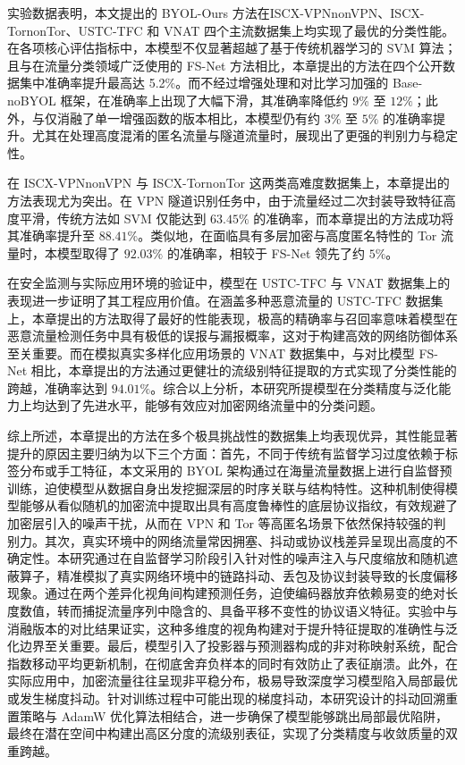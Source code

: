 实验数据表明，本文提出的 BYOL-Ours 方法在ISCX-VPNnonVPN、ISCX-TornonTor、USTC-TFC 和 VNAT 四个主流数据集上均实现了最优的分类性能。在各项核心评估指标中，本模型不仅显著超越了基于传统机器学习的 SVM 算法；且与在流量分类领域广泛使用的 FS-Net 方法相比，本章提出的方法在四个公开数据集中准确率提升最高达 5.2\%。而不经过增强处理和对比学习加强的 Base-noBYOL 框架，在准确率上出现了大幅下滑，其准确率降低约 $9\%$ 至 $12\%$；此外，与仅消融了单一增强函数的版本相比，本模型仍有约 $3\%$ 至 $5\%$ 的准确率提升。尤其在处理高度混淆的匿名流量与隧道流量时，展现出了更强的判别力与稳定性。

在 ISCX-VPNnonVPN 与 ISCX-TornonTor 这两类高难度数据集上，本章提出的方法表现尤为突出。在 VPN 隧道识别任务中，由于流量经过二次封装导致特征高度平滑，传统方法如 SVM 仅能达到 $63.45\%$ 的准确率，而本章提出的方法成功将其准确率提升至 $88.41\%$。类似地，在面临具有多层加密与高度匿名特性的 Tor 流量时，本模型取得了 $92.03\%$ 的准确率，相较于 FS-Net 领先了约 $5\%$。

在安全监测与实际应用环境的验证中，模型在 USTC-TFC 与 VNAT 数据集上的表现进一步证明了其工程应用价值。在涵盖多种恶意流量的 USTC-TFC 数据集上，本章提出的方法取得了最好的性能表现，极高的精确率与召回率意味着模型在恶意流量检测任务中具有极低的误报与漏报概率，这对于构建高效的网络防御体系至关重要。而在模拟真实多样化应用场景的 VNAT 数据集中，与对比模型 FS-Net 相比，本章提出的方法通过更健壮的流级别特征提取的方式实现了分类性能的跨越，准确率达到 $94.01\%$。综合以上分析，本研究所提模型在分类精度与泛化能力上均达到了先进水平，能够有效应对加密网络流量中的分类问题。

综上所述，本章提出的方法在多个极具挑战性的数据集上均表现优异，其性能显著提升的原因主要归纳为以下三个方面：首先，不同于传统有监督学习过度依赖于标签分布或手工特征，本文采用的 BYOL 架构通过在海量流量数据上进行自监督预训练，迫使模型从数据自身出发挖掘深层的时序关联与结构特性。这种机制使得模型能够从看似随机的加密流中提取出具有高度鲁棒性的底层协议指纹，有效规避了加密层引入的噪声干扰，从而在 VPN 和 Tor 等高匿名场景下依然保持较强的判别力。其次，真实环境中的网络流量常因拥塞、抖动或协议栈差异呈现出高度的不确定性。本研究通过在自监督学习阶段引入针对性的噪声注入与尺度缩放和随机遮蔽算子，精准模拟了真实网络环境中的链路抖动、丢包及协议封装导致的长度偏移现象。通过在两个差异化视角间构建预测任务，迫使编码器放弃依赖易变的绝对长度数值，转而捕捉流量序列中隐含的、具备平移不变性的协议语义特征。实验中与消融版本的对比结果证实，这种多维度的视角构建对于提升特征提取的准确性与泛化边界至关重要。最后，模型引入了投影器与预测器构成的非对称映射系统，配合指数移动平均更新机制，在彻底舍弃负样本的同时有效防止了表征崩溃。此外，在实际应用中，加密流量往往呈现非平稳分布，极易导致深度学习模型陷入局部最优或发生梯度抖动。针对训练过程中可能出现的梯度抖动，本研究设计的抖动回溯重置策略与 AdamW 优化算法相结合，进一步确保了模型能够跳出局部最优陷阱，最终在潜在空间中构建出高区分度的流级别表征，实现了分类精度与收敛质量的双重跨越。

